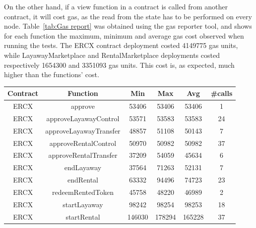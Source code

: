 \documentclass[english, LaM, oneside]{sapthesis}%
\begin{document}
On the other hand, if a view function in a contract is called from another contract, it will cost gas, as the read from the state has to be performed on every node. \newline
Table~\ref{tab:Gas report} was obtained using the gas reporter tool, and shows for each function the maximum, minimum and average gas cost observed when running the tests.\newline
The ERCX contract deployment costed 4149775 gas units, while LayawayMarketplace and RentalMarketplace deployments costed respectively 1654300 and 3351093 gas units. This cost is, as expected, much higher than the functions' cost.

\begin{table}
\centering
\begin{adjustbox}{width=0.75\textwidth}
\small
\begin{tabular}{@{}cccccc@{}}
\toprule
\textbf{Contract}  & \textbf{Function}            & \textbf{Min} & \textbf{Max} & \textbf{Avg} & \textbf{\#calls} \\ \midrule
ERCX               & approve                      & 53406        & 53406        & 53406        & 1                \\
ERCX               & approveLayawayControl        & 53571        & 53583        & 53583        & 24               \\
ERCX               & approveLayawayTransfer       & 48857        & 51108        & 50143        & 7                \\
ERCX               & approveRentalControl         & 50970        & 50982        & 50982        & 37               \\
ERCX               & approveRentalTransfer        & 37209        & 54059        & 45634        & 6                \\
ERCX               & endLayaway                   & 37564        & 71263        & 52131        & 7                \\
ERCX               & endRental                    & 63332        & 94496        & 74723        & 23               \\
ERCX               & redeemRentedToken            & 45758        & 48220        & 46989        & 2                \\
ERCX               & startLayaway                 & 98242        & 98254        & 98253        & 18               \\
ERCX               & startRental                  & 146030       & 178294       & 165228       & 37               \\

\end{tabular}
\end{adjustbox}
\end{table}
\end{document}
